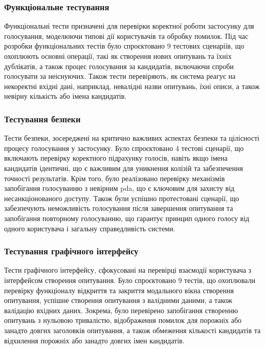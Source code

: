\documentclass[14pt]{extreport}
\begin{document}
  \subsubsection{Функціональне тестування}
  
  Функціональні тести призначені для перевірки коректної роботи застосунку для голосування, моделюючи типові дії користувачів та обробку помилок. Під час розробки функціональних тестів було спроєктовано 9 тестових сценаріїв, що охоплюють основні операції, такі як створення нових опитувань та їхніх дублікатів, а також процес голосування за кандидатів, включаючи спроби голосувати за неіснуючих. Також тести перевіряють, як система реагує на некоректні вхідні дані, наприклад, невалідні назви опитувань, їхні описи, а також невірну кількість або імена кандидатів.
  
  \subsubsection{Тестування безпеки}
  
  Тести безпеки, зосереджені на критично важливих аспектах безпеки та цілісності процесу голосування у застосунку. Було спроєктовано 4 тестові сценарії, що включають перевірку коректного підрахунку голосів, навіть якщо імена кандидатів ідентичні, що є важливим для уникнення колізій та забезпечення точності результатів. Крім того, було реалізовано перевірку механізмів запобігання голосуванню з невірним \gls{pda}, що є ключовим для захисту від несанкціонованого доступу. Також були успішно протестовані сценарії, що забезпечують неможливість голосування після завершення опитування та запобігання повторному голосуванню, що гарантує принцип одного голосу від одного користувача і загальну справедливість системи.
  
  \subsubsection{Тестування графічного інтерфейсу}
  
  Тести графічного інтерфейсу, сфокусовані на перевірці взаємодії користувача з інтерфейсом створення опитування. Було спроєктовано 9 тестів, що охоплювали перевірку функціоналу відкриття та закриття модального вікна створення опитування, успішне створення опитування з валідними даними, а також валідацію вхідних даних. Зокрема, було перевірено запобігання створенню опитувань з нульовою тривалістю, відображення помилок для порожніх або занадто довгих заголовків опитування, а також обмеження кількості кандидатів та відхилення порожніх або занадто довгих імен кандидатів.
  
\end{document}
